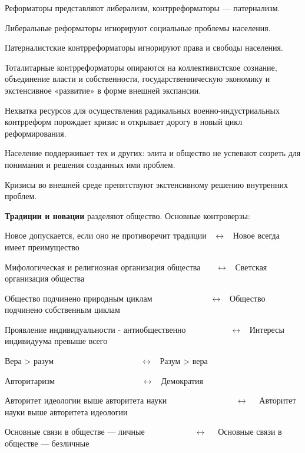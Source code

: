 Реформаторы представляют либерализм, контрреформаторы — патернализм.

Либеральные реформаторы игнорируют социальные проблемы населения.

Патерналистские контрреформаторы игнорируют права и свободы населения.

Тоталитарные контрреформаторы опираются на коллективистское сознание, объединение власти и собственности,
государственническую экономику и экстенсивное «развитие» в форме внешней экспансии.

Нехватка ресурсов для осуществления радикальных военно-индустриальных контрреформ порождает кризис и открывает дорогу в
новый цикл реформирования.

Население поддерживает тех и других: элита и общество не успевают созреть для понимания и решения созданных ими
проблем.

Кризисы во внешней среде препятствуют экстенсивному решению внутренних проблем.


\bigskip

\textbf{Традиции и новации }разделяют общество. Основные контроверзы:

Новое допускается, если оно не противоречит традиции \ $\leftrightarrow $ \ Новое всегда имеет преимущество

Мифологическая и религиозная организация общества \ \ \ $\leftrightarrow $ \ Светская организация общества

Общество подчинено природным циклам\ \ \ \  \ \ \ \ \ \ \ \ \ \ $\leftrightarrow $ \ Общество подчинено собственным
циклам

Проявление индивидуальности - антиобщественно \ \ \ \ \ \ \ \ \ \ $\leftrightarrow $ \ Интересы индивидуума превыше
всего

Вера {\textgreater} разум\ \ \ \ \ \ \ \ \ \  \ \ \ \ \ \ \ \ \ \ \ $\leftrightarrow $ \ Разум {\textgreater} вера

Авторитаризм\ \ \ \ \ \ \ \ \ \  \ \ \ \ \ \ \ \ \ \ \ $\leftrightarrow $ \ Демократия

Авторитет идеологии выше авторитета науки \ \ \ \ \ \ \ \ \ \ \ \ \ \ \ \ $\leftrightarrow $ \ \ Авторитет науки выше
авторитета идеологии

Основные связи в обществе — личные\ \ \ \  \ \ \ \ \ \ \ \ $\leftrightarrow $ \ \ Основные связи в обществе — безличные


\bigskip
%

